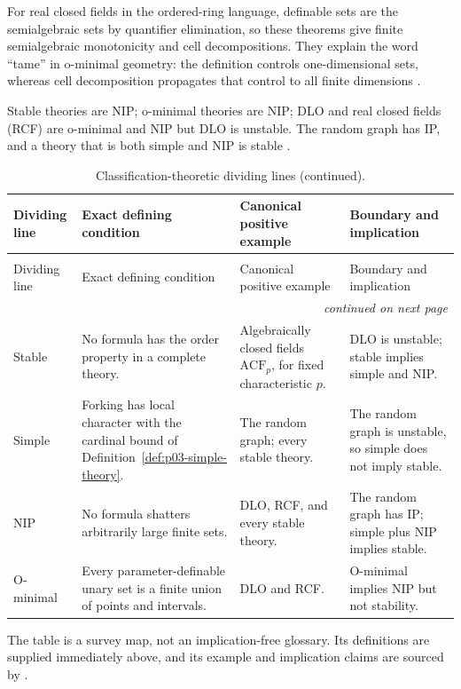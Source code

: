 For real closed fields in the ordered-ring language, definable sets are the
semialgebraic sets by quantifier elimination, so these theorems give finite
semialgebraic monotonicity and cell decompositions.  They explain the word
``tame'' in o-minimal geometry: the definition controls one-dimensional sets,
whereas cell decomposition propagates that control to all finite dimensions
\cite{PillaySteinhorn1986,VanDenDries1998,Marker2002}.

Stable theories are NIP; o-minimal theories are NIP; DLO and real closed
fields (RCF) are o-minimal and NIP but DLO is unstable.  The random graph has IP,
and a theory that is both simple and NIP is stable
\cite{Simon2015,VanDenDries1998,PillaySteinhorn1986,TentZiegler2012}.

\begingroup\small
\setlength{\tabcolsep}{4pt}
\begin{longtable}{@{}p{}p{}p{}p{}@{}}
\caption{Classification-theoretic dividing lines.}
\label{tab:p03-classification-overview}\\
\toprule
Dividing line & Exact defining condition & Canonical positive example &
Boundary and implication \\
\midrule
\endfirsthead
\caption[]{Classification-theoretic dividing lines (continued).}\\
\toprule
Dividing line & Exact defining condition & Canonical positive example &
Boundary and implication \\
\midrule
\endhead
\midrule\multicolumn{4}{r}{\emph{continued on next page}}\\
\endfoot
\endlastfoot
Stable & No formula has the order property in a complete theory. &
Algebraically closed fields \(\mathrm{ACF}_p\), for fixed characteristic \(p\). &
DLO is unstable; stable implies simple and NIP. \\
\addlinespace
Simple & Forking has local character with the cardinal bound of
Definition~\ref{def:p03-simple-theory}. &
The random graph; every stable theory. &
The random graph is unstable, so simple does not imply stable. \\
\addlinespace
NIP & No formula shatters arbitrarily large finite sets. &
DLO, RCF, and every stable theory. &
The random graph has IP; simple plus NIP implies stable. \\
\addlinespace
O-minimal & Every parameter-definable unary set is a finite union of points
and intervals. &
DLO and RCF. &
O-minimal implies NIP but not stability. \\
\bottomrule
\end{longtable}
\endgroup

The table is a survey map, not an implication-free glossary.  Its definitions
are supplied immediately above, and its example and implication claims are
sourced by \cite{Shelah1971Stability,TentZiegler2012,Kim1998,Simon2015,
VanDenDries1998,PillaySteinhorn1986}.
